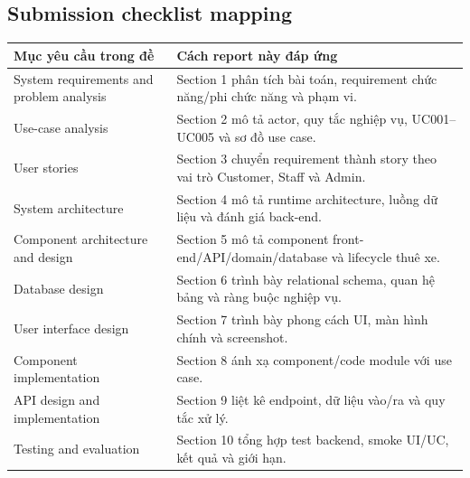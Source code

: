 \subsection{Submission checklist mapping}
\begin{longtable}{P{0.40\textwidth}P{0.50\textwidth}}
\toprule
\textbf{Mục yêu cầu trong đề} & \textbf{Cách report này đáp ứng} \\
\midrule
System requirements and problem analysis & Section 1 phân tích bài toán, requirement chức năng/phi chức năng và phạm vi. \\
Use-case analysis & Section 2 mô tả actor, quy tắc nghiệp vụ, UC001--UC005 và sơ đồ use case. \\
User stories & Section 3 chuyển requirement thành story theo vai trò Customer, Staff và Admin. \\
System architecture & Section 4 mô tả runtime architecture, luồng dữ liệu và đánh giá back-end. \\
Component architecture and design & Section 5 mô tả component front-end/API/domain/database và lifecycle thuê xe. \\
Database design & Section 6 trình bày relational schema, quan hệ bảng và ràng buộc nghiệp vụ. \\
User interface design & Section 7 trình bày phong cách UI, màn hình chính và screenshot. \\
Component implementation & Section 8 ánh xạ component/code module với use case. \\
API design and implementation & Section 9 liệt kê endpoint, dữ liệu vào/ra và quy tắc xử lý. \\
Testing and evaluation & Section 10 tổng hợp test backend, smoke UI/UC, kết quả và giới hạn. \\
\bottomrule
\end{longtable}
